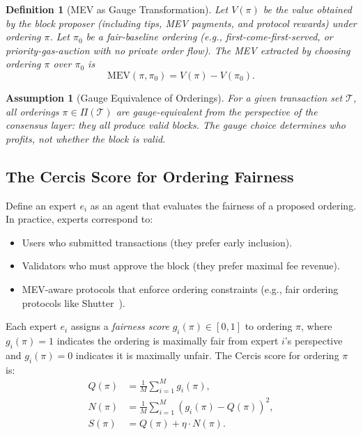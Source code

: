 \documentclass[12pt,a4paper]{article}
\newtheorem{definition}[theorem]{Definition}
\newtheorem{assumption}[theorem]{Assumption}
\theoremstyle{remark}
\newcommand{\T}{\mathcal{T}}
\newcommand{\Cercis}{\textsf{Cercis}}
\begin{document}
\begin{definition}[MEV as Gauge Transformation]
Let $V(\pi)$ be the value obtained by the block proposer (including tips,
MEV payments, and protocol rewards) under ordering $\pi$. Let $\pi_0$ be a
\emph{fair-baseline ordering} (e.g., first-come-first-served, or
priority-gas-auction with no private order flow). The MEV extracted by
choosing ordering $\pi$ over $\pi_0$ is
\begin{equation}
\text{MEV}(\pi, \pi_0) = V(\pi) - V(\pi_0).
\label{eq:mev_def}
\end{equation}
\end{definition}

\begin{assumption}[Gauge Equivalence of Orderings]
For a given transaction set $\T$, all orderings $\pi \in \Pi(\T)$ are
gauge-equivalent from the perspective of the consensus layer: they all
produce valid blocks. The gauge choice determines \emph{who profits}, not
\emph{whether the block is valid}.
\end{assumption}

\subsection{The Cercis Score for Ordering Fairness}

Define an expert $e_i$ as an agent that evaluates the fairness of a proposed
ordering. In practice, experts correspond to:
\begin{itemize}
\item Users who submitted transactions (they prefer early inclusion).
\item Validators who must approve the block (they prefer maximal fee revenue).
\item MEV-aware protocols that enforce ordering constraints (e.g., fair
ordering protocols like Shutter~\cite{shutter2024}).
\end{itemize}

Each expert $e_i$ assigns a \emph{fairness score} $g_i(\pi) \in [0,1]$ to
ordering $\pi$, where $g_i(\pi)=1$ indicates the ordering is maximally fair
from expert $i$'s perspective and $g_i(\pi)=0$ indicates it is maximally unfair.
The \Cercis{} score for ordering $\pi$ is:
\begin{align}
Q(\pi) &= \frac{1}{M} \sum_{i=1}^M g_i(\pi), \label{eq:mev_q} \\
N(\pi) &= \frac{1}{M} \sum_{i=1}^M \left(g_i(\pi) - Q(\pi)\right)^2, \label{eq:mev_n} \\
S(\pi) &= Q(\pi) + \eta \cdot N(\pi). \label{eq:mev_s}
\end{align}
\end{document}
